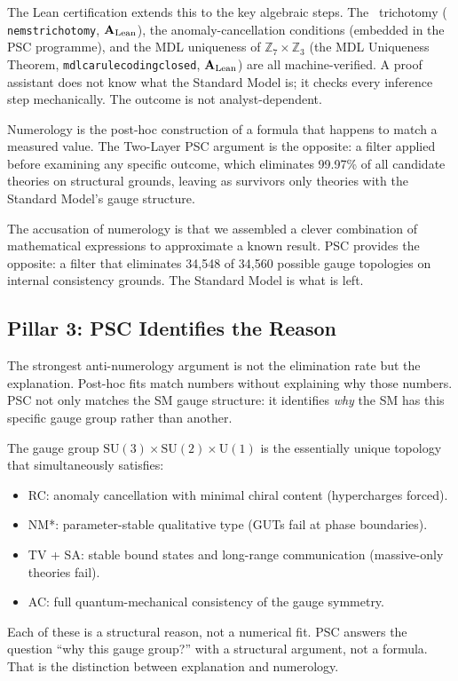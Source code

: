 \documentclass[11pt,openany]{book}
\theoremstyle{remark}
\newcommand{\NEMS}{\text{NEMS}}
\newcommand{\lean}[1]{%
  \penalty-100
  \begingroup\def\_{\textunderscore\allowbreak}\texttt{#1}\endgroup}
\newcommand{\CatAL}{\ensuremath{\textbf{A}_{\rm Lean}}}
\begin{document}
The Lean certification extends this to the key algebraic steps. The \NEMS\ trichotomy
(\lean{nems\_trichotomy}, \CatAL), the anomaly-cancellation conditions (embedded in
the PSC programme), and the MDL uniqueness of $\mathbb{Z}_7\times\mathbb{Z}_3$
(the MDL Uniqueness Theorem, \lean{mdl\_ca\_rule\_coding\_closed}, \CatAL) are all machine-verified.
A proof assistant does not know what the Standard Model is; it checks every inference
step mechanically. The outcome is not analyst-dependent.

\begin{tcolorbox}[colback=yellow!8,colframe=yellow!60!black,
  title={Why This Is Not Numerology: The Gauge Group}]
Numerology is the post-hoc construction of a formula that happens to match a measured
value. The Two-Layer PSC argument is the opposite: a filter applied before examining
any specific outcome, which eliminates 99.97\% of all candidate theories on structural
grounds, leaving as survivors only theories with the Standard Model's gauge structure.

The accusation of numerology is that we assembled a clever combination of mathematical
expressions to approximate a known result. PSC provides the opposite: a filter that
eliminates 34,548 of 34,560 possible gauge topologies on internal consistency grounds.
The Standard Model is what is left.
\end{tcolorbox}

\subsection*{Pillar 3: PSC Identifies the Reason}

The strongest anti-numerology argument is not the elimination rate but the explanation.
Post-hoc fits match numbers without explaining why those numbers. PSC not only
matches the SM gauge structure: it identifies \emph{why} the SM has this specific
gauge group rather than another.

The gauge group $\mathrm{SU}(3)\times\mathrm{SU}(2)\times\mathrm{U}(1)$ is the
essentially unique topology that simultaneously satisfies:
\begin{itemize}[itemsep=2pt]
\item RC: anomaly cancellation with minimal chiral content (hypercharges forced).
\item NM*: parameter-stable qualitative type (GUTs fail at phase boundaries).
\item TV + SA: stable bound states and long-range communication (massive-only theories fail).
\item AC: full quantum-mechanical consistency of the gauge symmetry.
\end{itemize}
Each of these is a structural reason, not a numerical fit. PSC answers the question
``why this gauge group?'' with a structural argument, not a formula. That is the
distinction between explanation and numerology.
\end{document}
